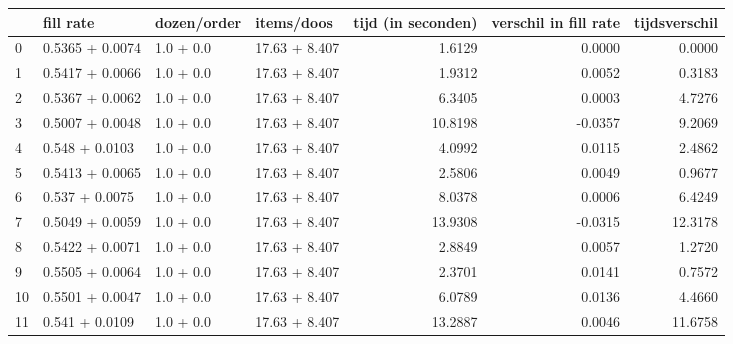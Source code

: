 \begin{tabular}{llllrrr}
\toprule
{} &        fill rate & dozen/order &     items/doos &  tijd (in seconden) &  verschil in fill rate &  tijdsverschil \\
\midrule
0  &  0.5365 + 0.0074 &   1.0 + 0.0 &  17.63 + 8.407 &              1.6129 &                 0.0000 &         0.0000 \\
1  &  0.5417 + 0.0066 &   1.0 + 0.0 &  17.63 + 8.407 &              1.9312 &                 0.0052 &         0.3183 \\
2  &  0.5367 + 0.0062 &   1.0 + 0.0 &  17.63 + 8.407 &              6.3405 &                 0.0003 &         4.7276 \\
3  &  0.5007 + 0.0048 &   1.0 + 0.0 &  17.63 + 8.407 &             10.8198 &                -0.0357 &         9.2069 \\
4  &   0.548 + 0.0103 &   1.0 + 0.0 &  17.63 + 8.407 &              4.0992 &                 0.0115 &         2.4862 \\
5  &  0.5413 + 0.0065 &   1.0 + 0.0 &  17.63 + 8.407 &              2.5806 &                 0.0049 &         0.9677 \\
6  &   0.537 + 0.0075 &   1.0 + 0.0 &  17.63 + 8.407 &              8.0378 &                 0.0006 &         6.4249 \\
7  &  0.5049 + 0.0059 &   1.0 + 0.0 &  17.63 + 8.407 &             13.9308 &                -0.0315 &        12.3178 \\
8  &  0.5422 + 0.0071 &   1.0 + 0.0 &  17.63 + 8.407 &              2.8849 &                 0.0057 &         1.2720 \\
9  &  0.5505 + 0.0064 &   1.0 + 0.0 &  17.63 + 8.407 &              2.3701 &                 0.0141 &         0.7572 \\
10 &  0.5501 + 0.0047 &   1.0 + 0.0 &  17.63 + 8.407 &              6.0789 &                 0.0136 &         4.4660 \\
11 &   0.541 + 0.0109 &   1.0 + 0.0 &  17.63 + 8.407 &             13.2887 &                 0.0046 &        11.6758 \\
\bottomrule
\end{tabular}
